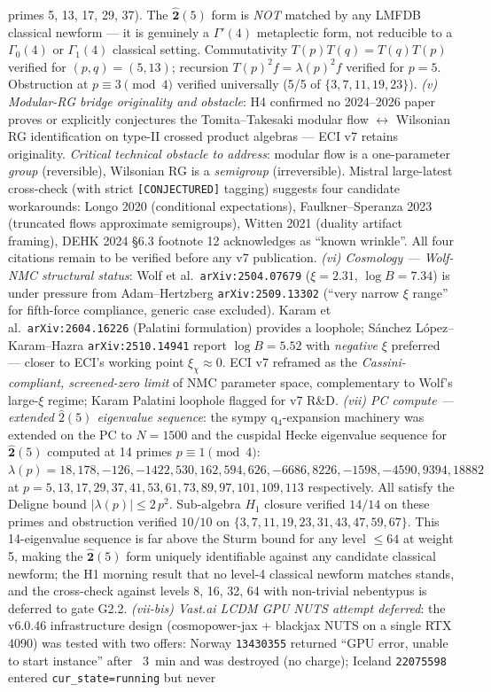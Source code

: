\documentclass[reprint,amsmath,amssymb,aps,prd,superscriptaddress]{revtex4-2}
\providecommand{\1}{\mathbf{1}}
\begin{document}
primes 5, 13, 17, 29, 37). The $\widehat{\bm{2}}(5)$ form is \emph{NOT} matched by any LMFDB classical newform — it is genuinely a $\Gamma'(4)$ metaplectic form, not reducible to a $\Gamma_0(4)$ or $\Gamma_1(4)$ classical setting. Commutativity $T(p) T(q) = T(q) T(p)$ verified for $(p,q) = (5,13)$; recursion $T(p)^2 f = \lambda(p)^2 f$ verified for $p = 5$. Obstruction at $p \equiv 3 \pmod 4$ verified universally (5/5 of $\{3,7,11,19,23\}$). \emph{(v) Modular-RG bridge originality and obstacle}: H4 confirmed no 2024--2026 paper proves or explicitly conjectures the Tomita--Takesaki modular flow $\leftrightarrow$ Wilsonian RG identification on type-II crossed product algebras — ECI v7 retains originality. \emph{Critical technical obstacle to address}: modular flow is a one-parameter \emph{group} (reversible), Wilsonian RG is a \emph{semigroup} (irreversible). Mistral large-latest cross-check (with strict \texttt{[CONJECTURED]} tagging) suggests four candidate workarounds: Longo 2020 (conditional expectations), Faulkner--Speranza 2023 (truncated flows approximate semigroups), Witten 2021 (duality artifact framing), DEHK 2024 \S 6.3 footnote 12 acknowledges as ``known wrinkle''. All four citations remain to be verified before any v7 publication. \emph{(vi) Cosmology — Wolf-NMC structural status}: Wolf et al.\ \texttt{arXiv:2504.07679} ($\xi = 2.31$, $\log B = 7.34$) is under pressure from Adam--Hertzberg \texttt{arXiv:2509.13302} (``very narrow $\xi$ range'' for fifth-force compliance, generic case excluded). Karam et al.\ \texttt{arXiv:2604.16226} (Palatini formulation) provides a loophole; S\'{a}nchez L\'{o}pez--Karam--Hazra \texttt{arXiv:2510.14941} report $\log B = 5.52$ with \emph{negative} $\xi$ preferred --- closer to ECI's working point $\xi_\chi \approx 0$. ECI v7 reframed as the \emph{Cassini-compliant, screened-zero limit} of NMC parameter space, complementary to Wolf's large-$\xi$ regime; Karam Palatini loophole flagged for v7 R\&D. \emph{(vii) PC compute --- extended $\hat{2}(5)$ eigenvalue sequence}: the sympy q$_4$-expansion machinery was extended on the PC to $N = 1500$ and the cuspidal Hecke eigenvalue sequence for $\widehat{\bm{2}}(5)$ computed at 14 primes $p \equiv 1 \pmod 4$: $\lambda(p) = 18, 178, -126, -1422, 530, 162, 594, 626, -6686, 8226, -1598, -4590, 9394, 18882$ at $p = 5, 13, 17, 29, 37, 41, 53, 61, 73, 89, 97, 101, 109, 113$ respectively. All satisfy the Deligne bound $|\lambda(p)| \le 2\,p^{2}$. Sub-algebra $H_1$ closure verified $14/14$ on these primes and obstruction verified $10/10$ on $\{3,7,11,19,23,31,43,47,59,67\}$. This 14-eigenvalue sequence is far above the Sturm bound for any level $\le 64$ at weight 5, making the $\widehat{\bm{2}}(5)$ form uniquely identifiable against any candidate classical newform; the H1 morning result that no level-4 classical newform matches stands, and the cross-check against levels 8, 16, 32, 64 with non-trivial nebentypus is deferred to gate G2.2. \emph{(vii-bis) Vast.ai LCDM GPU NUTS attempt deferred}: the v6.0.46 infrastructure design (cosmopower-jax + blackjax NUTS on a single RTX 4090) was tested with two offers: Norway \texttt{13430355} returned ``GPU error, unable to start instance'' after ~3~min and was destroyed (no charge); Iceland \texttt{22075598} entered \texttt{cur\_state=running} but never 
\end{document}
